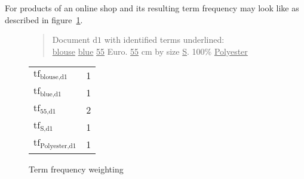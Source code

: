 For products of an online shop and its resulting term frequency may look like as described in figure~\ref{fig:tfweighting}.

\begin{figure}[h]

    \begin{quote}
        Document $\text{d}1$ with identified terms underlined:\\
        \underline{blouse} \underline{blue} \underline{55} Euro. \underline{55} cm by size \underline{S}. 100\% \underline{Polyester}
    \end{quote}

    \center
    \vspace{5mm}
    \begin{tabular}{ l l }
        \rowcolor{\dustRowHead}
        \multicolumn{2}{c}{Term frequency}\\\hline
        $\text{tf}_{\text{blouse},\text{d1}}$       & 1\\
        $\text{tf}_{\text{blue},\text{d1}}$         & 1\\
        $\text{tf}_{\text{55},\text{d1}}$           & 2\\
        $\text{tf}_{\text{S},\text{d1}}$            & 1\\
        $\text{tf}_{\text{Polyester},\text{d1}}$    & 1\\
    \end{tabular}

    \caption{Term frequency weighting}
    \label{fig:tfweighting}
\end{figure}

